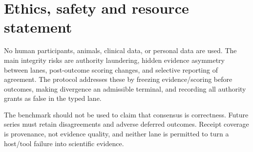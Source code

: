 \section{Ethics, safety and resource statement}

No human participants, animals, clinical data, or personal data are used. The main integrity risks are authority laundering, hidden evidence asymmetry between lanes, post-outcome scoring changes, and selective reporting of agreement. The protocol addresses these by freezing evidence/scoring before outcomes, making divergence an admissible terminal, and recording all authority grants as false in the typed lane.

The benchmark should not be used to claim that consensus is correctness. Future series must retain disagreements and adverse deferred outcomes. Receipt coverage is provenance, not evidence quality, and neither lane is permitted to turn a host/tool failure into scientific evidence.